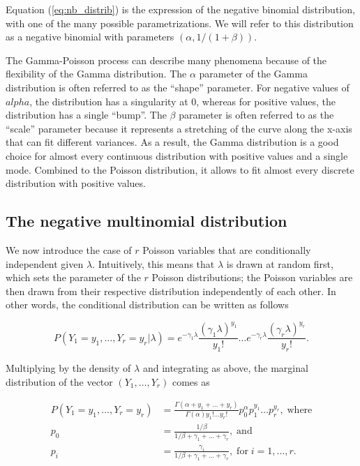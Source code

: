 \documentclass[12pt]{article}
\begin{document}
\begin{appendices}
    Equation (\ref{eq:nb_distrib}) is the expression of the negative
    binomial distribution, with one of the many possible
    parametrizations. We will refer to this distribution as a
    negative binomial with parameters $(\alpha, 1/(1+\beta))$.

    The Gamma-Poisson process can describe many phenomena
    because of the flexibility of the Gamma distribution. The
    $\alpha$ parameter of the Gamma distribution is often referred
    to as the ``shape'' parameter. For negative values of $alpha$,
    the distribution has a singularity at 0, whereas for positive
    values, the distribution has a single ``bump''. The $\beta$
    parameter is often referred to as the ``scale'' parameter
    because it represents a stretching of the curve along the x-axis
    that can fit different variances. As a result, the Gamma
    distribution is a good choice for almost every continuous
    distribution with positive values and a single mode. Combined
    to the Poisson distribution, it allows to fit almost every
    discrete distribution with positive values.

\subsection{The negative multinomial distribution}

    We now introduce the case of $r$ Poisson variables that are
    conditionally independent given $\lambda$. Intuitively, this
    means that $\lambda$ is drawn at random first, which sets the
    parameter of the $r$ Poisson distributions; the Poisson
    variables are then drawn from their respective distribution
    independently of each other. In other words, the conditional
    distribution can be written as follows

    \begin{equation}
\label{eq:conditional_nm}
      P(Y_1=y_1, \ldots, Y_r=y_r|\lambda) =
      e^{-\gamma_1\lambda}\frac{(\gamma_1\lambda)^{y_1}}{y_1!}
      \ldots
      e^{-\gamma_r\lambda}\frac{(\gamma_r\lambda)^{y_r}}{y_r!}.
    \end{equation}

    Multiplying by the density of $\lambda$ and integrating as
    above, the marginal distribution of the vector
    $(Y_1, \ldots, Y_r)$ comes as

    \begin{align}
\label{eq:nm_distrib}
      P(Y_1=y_1, \ldots, Y_r=y_r) &=
      \frac{\Gamma(\alpha+y_1+\ldots+y_r)}
      {\Gamma(\alpha)y_1!\ldots y_r!}p_0^{\alpha}p_1^{y_1}
      \ldots p_r^{y_r}, \; \text{where}                \\
      p_0 &= \frac{1/\beta}{1/\beta+\gamma_1+\ldots+\gamma_r},
      \; \text{and} \nonumber \\
      p_i &= \frac{\gamma_i}{1/\beta+\gamma_1+\ldots+\gamma_r},
      \; \text{for} \; i = 1, \ldots, r. \nonumber
    \end{align}


\end{appendices}
\end{document}
